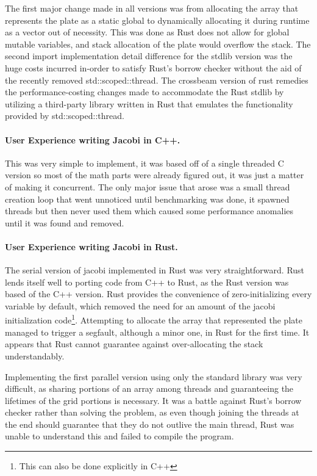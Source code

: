 \par The first major change made in all versions was
from allocating the array that represents the plate as a static global to
dynamically allocating it during runtime as a vector out of necessity. This was
done as Rust does not allow for global mutable variables, and stack allocation
of the plate would overflow the stack. The second import implementation detail
difference for the stdlib version was the huge costs incurred in-order to
satisfy Rust's borrow checker without the aid of the recently removed
{\cf std::scoped::thread}. The crossbeam version of rust remedies the
performance-costing changes made to accommodate the Rust stdlib by utilizing a
third-party library written in Rust that emulates the functionality provided by
{\cf std::scoped::thread}.


\paragraph{User Experience writing Jacobi in C++.}
This was very simple to implement, it was based off of a single threaded C
version so most of the math parts were already figured out, it was just a
matter of making it concurrent. The only major issue that arose was a small
thread creation loop that went unnoticed until benchmarking was done, it
spawned threads but then never used them which caused some performance
anomalies until it was found and removed.

\paragraph{User Experience writing Jacobi in Rust.}
The serial version of jacobi implemented in Rust was very straightforward. Rust
lends itself well to porting code from C++ to Rust, as the Rust version was
based of the C++ version. Rust provides the convenience of zero-initializing
every variable by default, which removed the need for an amount of the jacobi
initialization code\footnote{This can also be done explicitly in C++}.
Attempting to allocate the array that represented the plate managed to trigger
a segfault, although a minor one, in Rust for the first time. It appears that
Rust cannot guarantee against over-allocating the stack understandably.

\par Implementing the first parallel version using only the standard library
was very difficult, as sharing portions of an array among threads and
guaranteeing the lifetimes of the grid portions is necessary. It was a battle
against Rust's borrow checker rather than solving the problem, as even though
joining the threads at the end should guarantee that they do not outlive the
main thread, Rust was unable to understand this and failed to compile the program.
